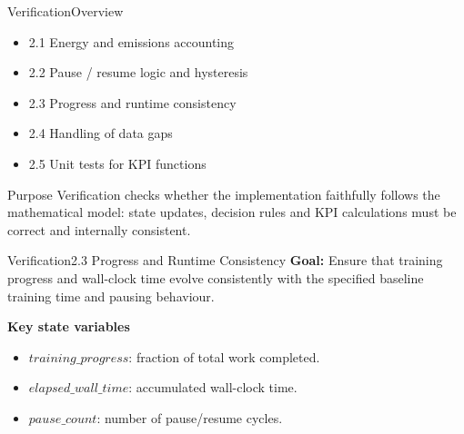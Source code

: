 \begin{frame}{Verification}{Overview}
  \begin{itemize}
    \item 2.1 Energy and emissions accounting
    \item 2.2 Pause / resume logic and hysteresis
    \item 2.3 Progress and runtime consistency
    \item 2.4 Handling of data gaps
    \item 2.5 Unit tests for KPI functions
  \end{itemize}
  \vspace{0.5cm}
  \begin{block}{Purpose}
    Verification checks whether the implementation faithfully follows the
    mathematical model: state updates, decision rules and KPI calculations
    must be correct and internally consistent.
  \end{block}
\end{frame}


\begin{frame}{Verification}{2.3 Progress and Runtime Consistency}
  \textbf{Goal:} Ensure that training progress and wall-clock time evolve
  consistently with the specified baseline training time and pausing behaviour.
  \vspace{0.3cm}

  \textbf{Key state variables}
  \begin{itemize}
    \item $\mathit{training\_progress}$: fraction of total work completed.
    \item $\mathit{elapsed\_wall\_time}$: accumulated wall-clock time.
    \item $\mathit{pause\_count}$: number of pause/resume cycles.
  \end{itemize}
\end{frame}

